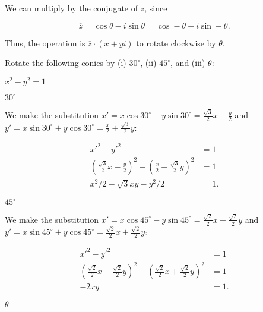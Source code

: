 \documentclass[../key.tex]{subfiles}
\begin{document}
\noindent We can multiply by the conjugate of $z$, since

$$\overline{z}=\cos\theta - i\sin\theta = \cos-\theta + i\sin-\theta.$$

\noindent Thus, the operation is $\overline{z}\cdot (x+yi)$ to rotate clockwise by $\theta$.

\begin{outer_problem}
\item Rotate the following conics by (i) $30^\circ$, (ii) $45^\circ$, and (iii) $\theta$:
\end{outer_problem}

\begin{inner_problem}[start=1]
\item $x^2-y^2=1$
\end{inner_problem}

\begin{iinner_problem}[start=1]
\item $30^\circ$
\end{iinner_problem}

\noindent We make the substitution $x'=x \cos 30^\circ - y\sin 30^\circ=\frac{\sqrt{3}}{2}x-\frac{y}{2}$ and $y'=x\sin 30^\circ + y\cos 30^\circ=\frac{x}{2}+\frac{\sqrt{3}}{2}y$:

\begin{align*}
x'^2-y'^2&=1 \\
\left(\frac{\sqrt{3}}{2}x-\frac{y}{2}\right)^2 - \left(\frac{x}{2}+\frac{\sqrt{3}}{2}y\right)^2 &= 1 \\
x^2/2 - \sqrt{3} x y - y^2/2 &= 1.
\end{align*}

\begin{iinner_problem}
\item $45^\circ$
\end{iinner_problem}

\noindent We make the substitution $x'=x \cos 45^\circ - y\sin 45^\circ=\frac{\sqrt{2}}{2}x-\frac{\sqrt{2}}{2}y$ and $y'=x\sin 45^\circ + y\cos 45^\circ=\frac{\sqrt{2}}{2}x+\frac{\sqrt{2}}{2}y$:

\begin{align*}
x'^2-y'^2 &= 1 \\
\left(\frac{\sqrt{2}}{2}x-\frac{\sqrt{2}}{2}y\right)^2 - \left(\frac{\sqrt{2}}{2}x+\frac{\sqrt{2}}{2}y\right)^2 &= 1 \\
-2xy &= 1.
\end{align*}

\begin{iinner_problem}
\item $\theta$
\end{iinner_problem}
\end{document}
